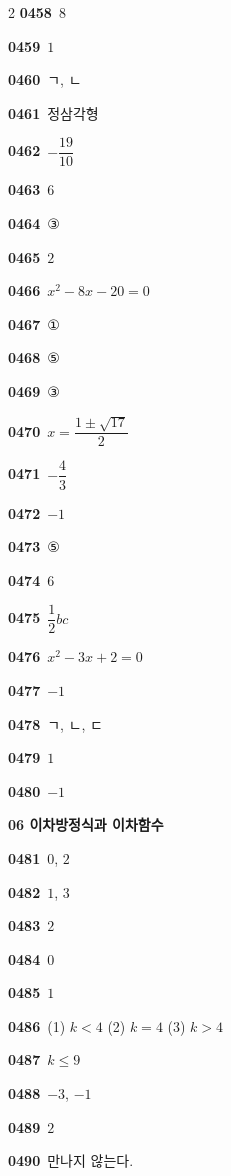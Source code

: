 \documentclass[10pt,a4paper]{article}
\begin{document}
\begin{multicols}{2}
\noindent\textbf{0458}\ $8$\par
\noindent\textbf{0459}\ $1$\par
\noindent\textbf{0460}\ ㄱ, ㄴ\par
\noindent\textbf{0461}\ 정삼각형\par
\noindent\textbf{0462}\ $-\dfrac{19}{10}$\par
\noindent\textbf{0463}\ $6$\par
\noindent\textbf{0464}\ ③\par
\noindent\textbf{0465}\ $2$\par
\noindent\textbf{0466}\ $x^2-8x-20=0$\par
\noindent\textbf{0467}\ ①\par
\noindent\textbf{0468}\ ⑤\par
\noindent\textbf{0469}\ ③\par
\noindent\textbf{0470}\ $x=\dfrac{1\pm\sqrt{17}}{2}$\par
\noindent\textbf{0471}\ $-\dfrac{4}{3}$\par
\noindent\textbf{0472}\ $-1$\par
\noindent\textbf{0473}\ ⑤\par
\noindent\textbf{0474}\ $6$\par
\noindent\textbf{0475}\ $\dfrac{1}{2}bc$\par
\noindent\textbf{0476}\ $x^2-3x+2=0$\par
\noindent\textbf{0477}\ $-1$\par
\noindent\textbf{0478}\ ㄱ, ㄴ, ㄷ\par
\noindent\textbf{0479}\ $1$\par
\noindent\textbf{0480}\ $-1$\par
\noindent\textbf{06 이차방정식과 이차함수}\par\smallskip
\noindent\textbf{0481}\ $0$, $2$\par
\noindent\textbf{0482}\ $1$, $3$\par
\noindent\textbf{0483}\ $2$\par
\noindent\textbf{0484}\ $0$\par
\noindent\textbf{0485}\ $1$\par
\noindent\textbf{0486}\ (1) $k<4$ \quad (2) $k=4$ \quad (3) $k>4$\par
\noindent\textbf{0487}\ $k\le 9$\par
\noindent\textbf{0488}\ $-3$, $-1$\par
\noindent\textbf{0489}\ $2$\par
\noindent\textbf{0490}\ 만나지 않는다.\par

\end{multicols}
\end{document}
